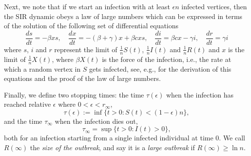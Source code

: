 \documentclass[11pt]{article}
\begin{document}
Next, we note that if we start an infection with at least $\epsilon n$ infected vertices, then the SIR dynamic obeys a law of large numbers which can be expressed in terms of the solution of the following set of differential equations
\begin{equation}\label{SIR-diff}
\frac {ds}{dt}=-\beta xs
,\quad
\frac {dx}{dt}= -(\beta+\gamma)x +\beta c x s 
,\quad
\frac{di}{dt}=\beta c x -\gamma i
, \quad
\frac {dr}{dt}=\gamma i
\end{equation}
where $s$, $i$ and $r$ represent the limit of $\frac 1n S(t)$, $\frac 1n I(t)$ and $\frac 1nR(t)$ and $x$ is the limit of $\frac 1n X(t)$, where $\beta X(t)$ is the force of the infection, i.e., the rate at which a random vertex in $S$ gets infected, see, e.g., 
\cite{ball2020epidemics,borgs2024lawlargenumberssir} for the derivation of this equations and the proof of the law of large numbers.

Finally, 
we define two stopping times: the time $\tau(\epsilon)$ when the infection has reached relative $\epsilon$ where $0<\epsilon<r_\infty$, 
\begin{equation}\label{tau-single}
      \tau(\epsilon) := \inf\{t > 0 : S(t) < (1-\epsilon)n\},
\end{equation}
and the time $\tau_\infty$ when the 
infection dies out,
\begin{equation}\label{tau-infty-single}
    \tau_\infty=\sup\{t>0: I(t)>0\},
\end{equation}
both for an infection starting from a single infected individual at time $0$.
We call $R(\infty)$  the \textit{size of the outbreak}, and say it is a \textit{large outbreak} if $R(\infty)\geq \ln n$.
\end{document}
